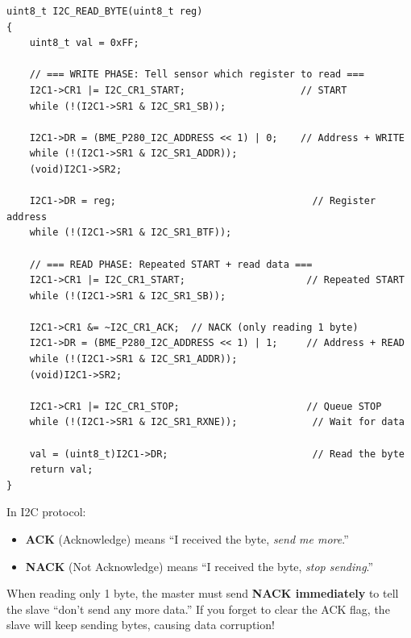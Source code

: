 \documentclass[12pt, a4paper]{article}
\begin{document}
\begin{codebox}
\begin{lstlisting}[style=CStyle]
uint8_t I2C_READ_BYTE(uint8_t reg)
{
    uint8_t val = 0xFF;

    // === WRITE PHASE: Tell sensor which register to read ===
    I2C1->CR1 |= I2C_CR1_START;                    // START
    while (!(I2C1->SR1 & I2C_SR1_SB));

    I2C1->DR = (BME_P280_I2C_ADDRESS << 1) | 0;    // Address + WRITE
    while (!(I2C1->SR1 & I2C_SR1_ADDR));
    (void)I2C1->SR2;

    I2C1->DR = reg;                                  // Register address
    while (!(I2C1->SR1 & I2C_SR1_BTF));

    // === READ PHASE: Repeated START + read data ===
    I2C1->CR1 |= I2C_CR1_START;                     // Repeated START
    while (!(I2C1->SR1 & I2C_SR1_SB));

    I2C1->CR1 &= ~I2C_CR1_ACK;  // NACK (only reading 1 byte)
    I2C1->DR = (BME_P280_I2C_ADDRESS << 1) | 1;     // Address + READ
    while (!(I2C1->SR1 & I2C_SR1_ADDR));
    (void)I2C1->SR2;

    I2C1->CR1 |= I2C_CR1_STOP;                      // Queue STOP
    while (!(I2C1->SR1 & I2C_SR1_RXNE));             // Wait for data

    val = (uint8_t)I2C1->DR;                         // Read the byte
    return val;
}
\end{lstlisting}
\end{codebox}

\begin{conceptbox}
In I2C protocol:
\begin{itemize}[leftmargin=1.5em]
    \item \textbf{ACK} (Acknowledge) means ``I received the byte, \textit{send me more}.''
    \item \textbf{NACK} (Not Acknowledge) means ``I received the byte, \textit{stop sending}.''
\end{itemize}
When reading only 1 byte, the master must send \textbf{NACK immediately} to tell the slave ``don't send any more data.'' If you forget to clear the ACK flag, the slave will keep sending bytes, causing data corruption!
\end{conceptbox}

\end{document}
